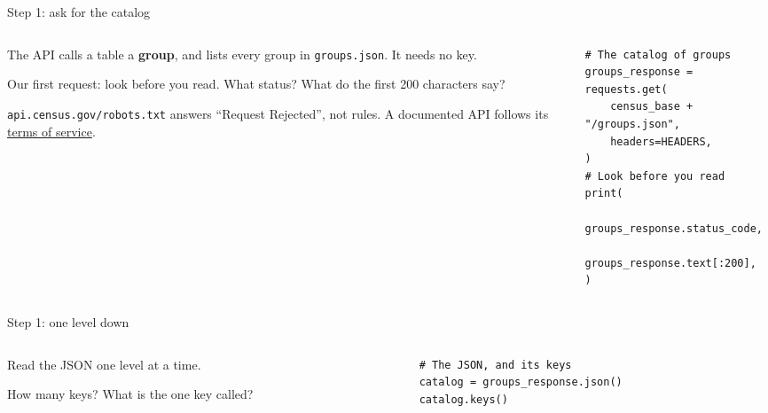 \documentclass[9pt,aspectratio=169]{beamer}
\begin{document}
\begin{frame}[fragile]{Step 1: ask for the catalog}
    \begin{columns}[T]
        \begin{column}{0.37\textwidth}
            The API calls a table a \textbf{group}, and lists every group in \texttt{groups.json}. It needs no key.

            \medskip
            Our first request: look before you read. What status? What do the first 200 characters say?

            \medskip
            {\footnotesize \texttt{api.census.gov/robots.txt} answers ``Request Rejected'', not rules. A documented API follows its \href{https://www.census.gov/data/developers/about/terms-of-service.html}{terms of service}.\par}
        \end{column}
        \begin{column}{0.6\textwidth}
\begin{lstlisting}
# The catalog of groups
groups_response = requests.get(
    census_base + "/groups.json",
    headers=HEADERS,
)
# Look before you read
print(
    groups_response.status_code,
    groups_response.text[:200],
)
\end{lstlisting}
        \end{column}
    \end{columns}
\end{frame}

\begin{frame}[fragile]{Step 1: one level down}
    \begin{columns}[T]
        \begin{column}{0.37\textwidth}
            Read the JSON one level at a time.

            \medskip
            How many keys? What is the one key called?
        \end{column}
        \begin{column}{0.6\textwidth}
\begin{lstlisting}
# The JSON, and its keys
catalog = groups_response.json()
catalog.keys()
\end{lstlisting}
        \end{column}
    \end{columns}
\end{frame}
\end{document}
